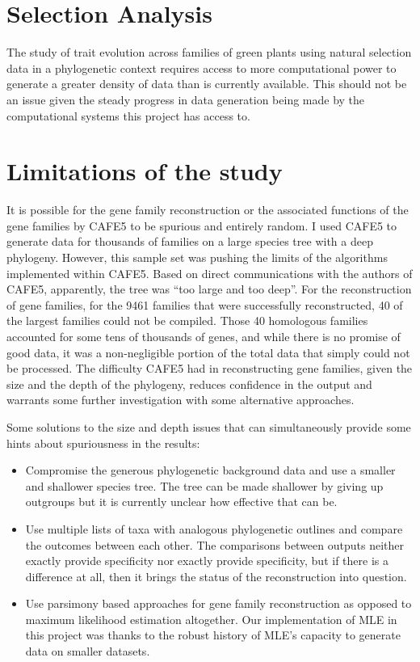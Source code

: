 \section{Selection Analysis}

The study of trait evolution across families of green plants using natural selection data in a
phylogenetic context requires access to more computational power to generate a greater density
of data than is currently available. This should not be an issue given the steady progress in data
generation being made by the computational systems this project has access to.

\section{Limitations of the study}

It is possible for the gene family reconstruction or the associated functions of the gene
families by CAFE5 to be spurious and entirely random. I used CAFE5 to generate data for
thousands of families on a large species tree with a deep phylogeny. However, this sample set
was pushing the limits of the algorithms implemented within CAFE5. Based on direct
communications with the authors of CAFE5, apparently, the tree was “too large and too deep”.
For the reconstruction of gene families, for the 9461 families that were successfully
reconstructed, 40 of the largest families could not be compiled. Those 40 homologous families
accounted for some tens of thousands of genes, and while there is no promise of good data, it
was a non-negligible portion of the total data that simply could not be processed. The difficulty
CAFE5 had in reconstructing gene families, given the size and the depth of the phylogeny,
reduces confidence in the output and warrants some further investigation with some alternative
approaches.

Some solutions to the size and depth issues that can simultaneously provide some hints
about spuriousness in the results:

\begin{itemize}

    \item Compromise the generous phylogenetic background data and use a smaller and shallower
    species tree. The tree can be made shallower by giving up outgroups but it is currently
    unclear how effective that can be.

    \item Use multiple lists of taxa with analogous phylogenetic outlines and compare the
    outcomes between each other. The comparisons between outputs neither exactly provide
    specificity nor exactly provide specificity, but if there is a difference at all, then it brings
    the status of the reconstruction into question.

    \item Use parsimony based approaches for gene family reconstruction as opposed to maximum
    likelihood estimation altogether. Our implementation of MLE in this project was thanks
    to the robust history of MLE’s capacity to generate data on smaller datasets.
\end{itemize}

